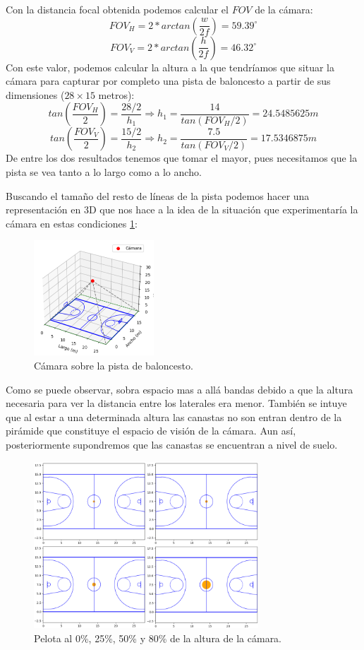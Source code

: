 \documentclass[12pt]{article}
\begin{document}
Con la distancia focal obtenida podemos calcular el $FOV$ de la cámara:
$$FOV_H = 2*arctan \left( \frac{w}{2f} \right) = 59.39^{\circ}$$ 
$$FOV_V = 2*arctan \left( \frac{h}{2f} \right) = 46.32^{\circ}$$
Con este valor, podemos calcular la altura a la que tendríamos que situar la cámara para capturar por completo una pista de baloncesto a partir de sus dimensiones ($28 \times 15$ metros):
$$
tan \left( \frac{FOV_H}{2} \right) = \frac{28/2}{h_1} \Rightarrow h_1 = \frac{14}{tan(FOV_H/2)}=24.5485625m
$$
$$
tan \left( \frac{FOV_V}{2} \right) = \frac{15/2}{h_2} \Rightarrow h_2 = \frac{7.5}{tan(FOV_V/2)}=17.5346875m
$$
De entre los dos resultados tenemos que tomar el mayor, pues necesitamos que la pista se vea tanto a lo largo como a lo ancho.

Buscando el tamaño del resto de líneas de la pista podemos hacer una representación en 3D que nos hace a la idea de la situación que experimentaría la cámara en estas condiciones \ref{fig:pista_basket}:
\begin{figure}[H]
    \centering
    \includegraphics[width=0.4\textwidth]{images_calibracion/Pista_basket.png}
    \caption{Cámara sobre la pista de baloncesto.}
    \label{fig:pista_basket}
\end{figure}
Como se puede observar, sobra espacio mas a allá bandas debido a que la altura necesaria para ver la distancia entre los laterales era menor. 
También se intuye que al estar a una determinada altura las canastas no son entran dentro de la pirámide que constituye el espacio de visión de la cámara.
Aun así, posteriormente supondremos que las canastas se encuentran a nivel de suelo.

\begin{figure}[H]
    \centering
    \includegraphics[width=0.75\textwidth]{images_calibracion/Pelota.png}  
    \caption{Pelota al 0\%, 25\%, 50\% y 80\% de la altura de la cámara.}
    \label{fig:pelota}
\end{figure}
\end{document}
